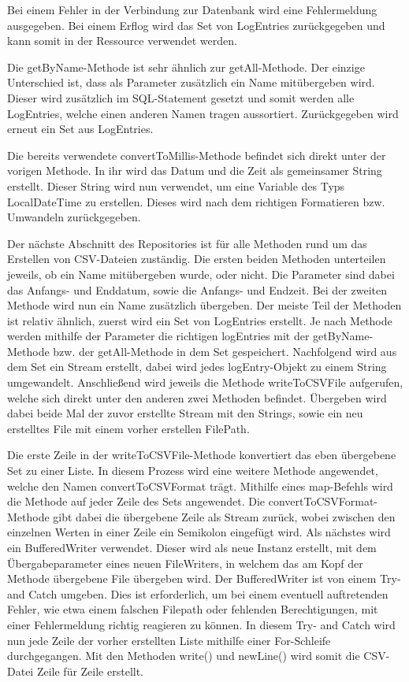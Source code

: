 Bei einem Fehler in der Verbindung zur Datenbank wird eine Fehlermeldung ausgegeben. Bei einem Erflog wird das Set von LogEntries zurückgegeben und kann somit in der Ressource verwendet werden. 

Die getByName-Methode ist sehr ähnlich zur getAll-Methode. Der einzige Unterschied ist, dass als Parameter zusätzlich ein Name mitübergeben wird. Dieser wird zusätzlich im SQL-Statement gesetzt und somit werden alle LogEntries, welche einen anderen Namen tragen aussortiert. Zurückgegeben wird erneut ein Set aus LogEntries.

Die bereits verwendete convertToMillis-Methode befindet sich direkt unter der vorigen Methode. In ihr wird das Datum und die Zeit als gemeinsamer String erstellt. Dieser String wird nun verwendet, um eine Variable des Typs LocalDateTime zu erstellen. Dieses wird nach dem richtigen Formatieren bzw. Umwandeln zurückgegeben.

Der nächste Abschnitt des Repositories ist für alle Methoden rund um das Erstellen von CSV-Dateien zuständig. Die ersten beiden Methoden unterteilen jeweils, ob ein Name mitübergeben wurde, oder nicht. Die Parameter sind dabei das Anfangs- und Enddatum, sowie die Anfangs- und Endzeit. Bei der zweiten Methode wird nun ein Name zusätzlich übergeben. Der meiste Teil der Methoden ist relativ ähnlich, zuerst wird ein Set von LogEntries erstellt. Je nach Methode werden mithilfe der Parameter die richtigen logEntries mit der getByName-Methode bzw. der getAll-Methode  in dem Set gespeichert. Nachfolgend wird aus dem Set ein Stream erstellt, dabei wird jedes logEntry-Objekt zu einem String umgewandelt. Anschließend wird jeweils die Methode writeToCSVFile aufgerufen, welche sich direkt unter den anderen zwei Methoden befindet. Übergeben wird dabei beide Mal der zuvor erstellte Stream mit den Strings, sowie ein neu erstelltes File mit einem vorher erstellen FilePath. 

Die erste Zeile in der writeToCSVFile-Methode konvertiert das eben übergebene Set zu einer Liste. In diesem Prozess wird eine weitere Methode angewendet, welche den Namen convertToCSVFormat trägt. Mithilfe eines map-Befehls wird die Methode auf jeder Zeile des Sets angewendet. Die convertToCSVFormat-Methode gibt dabei die übergebene Zeile als Stream zurück, wobei zwischen den einzelnen Werten in einer Zeile ein Semikolon eingefügt wird. Als nächstes wird ein BufferedWriter verwendet. Dieser wird als neue Instanz erstellt, mit dem Übergabeparameter eines neuen FileWriters, in welchem das am Kopf der Methode übergebene File übergeben wird. Der BufferedWriter ist von einem Try- and Catch umgeben. Dies ist erforderlich, um bei einem eventuell auftretenden Fehler, wie etwa einem falschen Filepath oder fehlenden Berechtigungen, mit einer Fehlermeldung richtig reagieren zu können. In diesem Try- and Catch wird nun jede Zeile der vorher erstellten Liste mithilfe einer For-Schleife durchgegangen. Mit den Methoden write() und newLine() wird somit die CSV-Datei Zeile für Zeile erstellt. 

